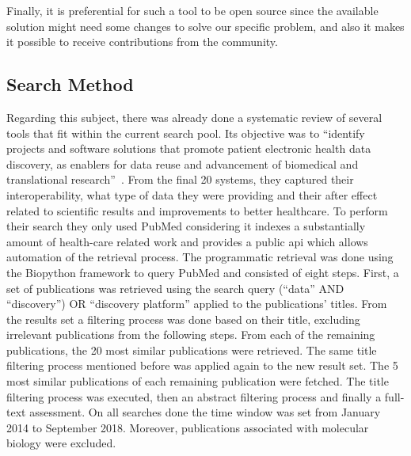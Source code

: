 
Finally, it is preferential for such a tool to be open source since the available
solution might need some changes to solve our specific problem, and also it makes it
possible to receive contributions from the community.

\subsection*{Search Method}

Regarding this subject, there was already done a systematic review of several tools that fit within the current search pool.
Its objective was to ``identify projects and software solutions that promote patient electronic health data discovery, as enablers for data reuse and advancement of biomedical and translational research''~\cite{systematic-review}.
From the final 20 systems, they captured their interoperability, what type of data they were providing and their after effect related to scientific results and improvements to better healthcare.
To perform their search they only used PubMed  considering it indexes a substantially amount of health-care related work and provides a public \gls{api} which allows automation of the retrieval process.
The programmatic retrieval was done using the Biopython framework to query PubMed and consisted of eight steps.
First, a set of publications was retrieved using the search query (``data'' AND ``discovery'') OR ``discovery platform'' applied to the publications' titles.
From the results set a filtering process was done based on their title, excluding irrelevant publications from the following steps.
From each of the remaining publications, the 20 most similar publications were retrieved.
The same title filtering process mentioned before was applied again to the new result set.
The 5 most similar publications of each remaining publication were fetched.
The title filtering process was executed, then an abstract filtering process and finally a full-text assessment.
On all searches done the time window was set from January 2014 to September 2018.
Moreover, publications associated with molecular biology were excluded.

